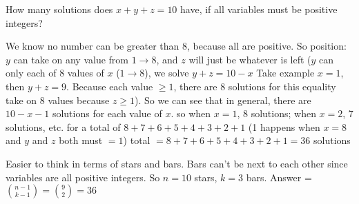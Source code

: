 \question How many solutions does $x + y + z = 10$ have, if all variables 
must be positive integers? 

\begin{solution}
We know no number can be greater than 8, because all are positive.
So position: $y$ can take on any value from $1 \rightarrow 8$, and $z$ will just be 
whatever is left ($y$ can only each of 8 values of $x$ 
($1 \rightarrow 8$), we solve $y + z = 10 - x$
Take example $x = 1$, then $y + z = 9$. Because each value $\ge 1$, there 
are 8 solutions for this equality take on 8 values because $z \ge 1$).
So we can see that in general, there are $10-x-1$ solutions for each 
value of $x$.
so when $x = 1$, 8 solutions; when $x = 2$, 7 solutions, etc. for a total 
of $8 + 7 + 6 + 5 + 4 + 3 + 2 + 1$ (1 happens when $x=8$ and $y$ and $z$ both must $= 1$)
total $= 8 + 7 + 6 + 5 + 4 + 3 + 2 + 1 = 36 $ solutions

Easier to think in terms of stars and bars. Bars can't be next to each 
other since variables are all positive integers. So $n = 10$ stars, 
$k = 3$ bars. Answer = ${n-1 \choose k-1} = {9 \choose 2} = 36$
\end{solution}